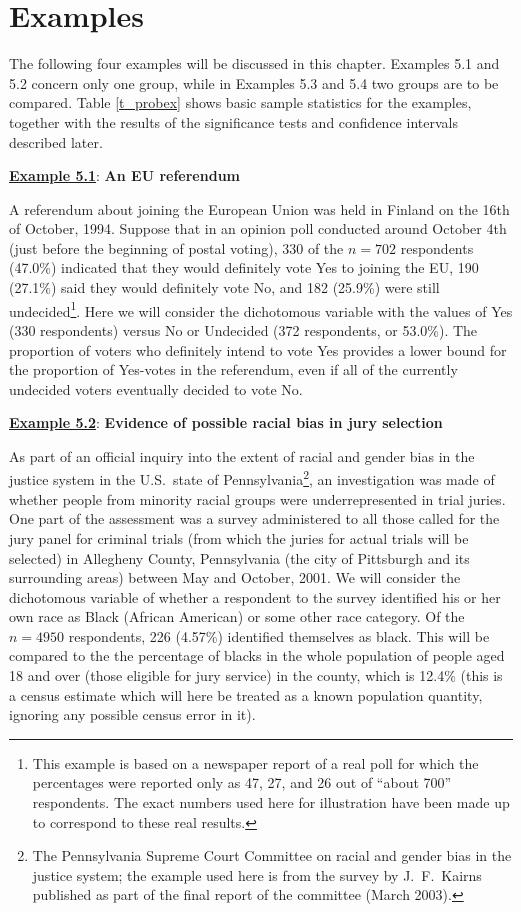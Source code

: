 \section{Examples}
\label{s_probs_examples}

The following four examples will be discussed in this chapter. Examples
5.1 and 5.2 concern only one group, while in Examples 5.3
and 5.4 two groups are to be compared. Table \ref{t_probex} shows basic
sample statistics for the examples, together with the results of the
significance tests and confidence intervals described later.

\underline{\textbf{Example 5.1}}: \textbf{An EU referendum}

A referendum about joining the European Union was held in Finland on the
16th of October, 1994. Suppose that in an opinion poll conducted around October 4th
(just before the beginning of postal voting), 330 of the $n=702$
respondents (47.0\%) indicated that they would definitely vote Yes to
joining the EU, 190 (27.1\%) said they would definitely vote No, and 182
(25.9\%) were still undecided\footnote{This example is based on a
newspaper report of a real poll for which the percentages were reported
only as 47, 27, and 26 out of ``about 700'' respondents. The exact
numbers used here for illustration have been made up to correspond to
these real results.}. Here we will consider the dichotomous variable with the
values of Yes (330 respondents) versus No or Undecided (372 respondents,
or 53.0\%). The proportion of voters who definitely intend to vote Yes
provides a lower bound for the proportion of Yes-votes in the
referendum, even if all of the currently undecided voters eventually
decided to vote No.

\underline{\textbf{Example 5.2}}: \textbf{Evidence of possible racial
bias in jury selection}

As part of an official inquiry into the extent of racial and gender bias
in the justice system in the U.S.\ state of Pennsylvania\footnote{ The
Pennsylvania Supreme Court Committee on racial and gender bias in the
justice system; the example used here is from the survey by J.\ F.\
Kairns published as part of the final report of the committee (March
2003).},
an
investigation was made of whether people from minority racial groups
were underrepresented in trial juries. One part of the assessment was
a survey administered to all those called for the jury panel for
criminal trials (from which the juries for actual trials will be
selected) in Allegheny County, Pennsylvania (the city of Pittsburgh and
its surrounding areas) between May and October, 2001. We will consider
the dichotomous variable of whether a respondent to the survey identified
his or her own race as Black (African American) or some other race
category. Of the $n=4950$ respondents, 226 (4.57\%) identified
themselves as black. This will be compared to the the percentage of
blacks in the whole population of people aged 18 and over (those eligible
for jury service) in the county, which is 12.4\% (this is a census
estimate which will here be treated as a known population quantity,
ignoring any possible census error in it).

